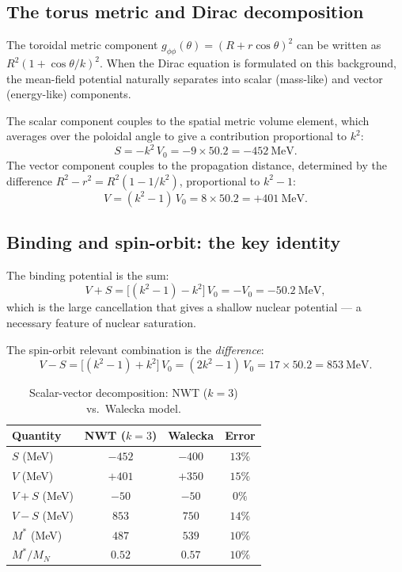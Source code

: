 \documentclass[11pt,a4paper]{article}
\begin{document}
\subsection{The torus metric and Dirac decomposition}

The toroidal metric component $g_{\phi\phi}(\theta) = (R + r\cos\theta)^2$
can be written as $R^2(1 + \cos\theta/k)^2$.  When the Dirac equation is
formulated on this background, the mean-field potential naturally separates
into scalar (mass-like) and vector (energy-like) components.

The scalar component couples to the spatial metric volume element, which
averages over the poloidal angle to give a contribution proportional to $k^2$:
\begin{equation}
  S = -k^2\, V_0 = -9 \times 50.2 = -452~\text{MeV}.
  \label{eq:scalar}
\end{equation}
The vector component couples to the propagation distance, determined by the
difference $R^2 - r^2 = R^2(1 - 1/k^2)$, proportional to $k^2 - 1$:
\begin{equation}
  V = (k^2 - 1)\, V_0 = 8 \times 50.2 = +401~\text{MeV}.
  \label{eq:vector}
\end{equation}

\subsection{Binding and spin-orbit: the key identity}

The binding potential is the sum:
\begin{equation}
  V + S = \bigl[(k^2-1) - k^2\bigr]\,V_0 = -V_0 = -50.2~\text{MeV},
  \label{eq:binding}
\end{equation}
which is the large cancellation that gives a shallow nuclear potential ---
a necessary feature of nuclear saturation.

The spin-orbit relevant combination is the \emph{difference}:
\begin{equation}
  V - S = \bigl[(k^2-1) + k^2\bigr]\,V_0 = (2k^2-1)\,V_0
  = 17 \times 50.2 = 853~\text{MeV}.
  \label{eq:vms}
\end{equation}

\begin{table}[h]
\centering
\caption{Scalar-vector decomposition: NWT ($k=3$) vs.\ Walecka model.}
\label{tab:sv}
\begin{tabular}{lccc}
\toprule
Quantity & NWT ($k=3$) & Walecka & Error \\
\midrule
$S$ (MeV)   & $-452$ & $-400$ & $13\%$ \\
$V$ (MeV)   & $+401$ & $+350$ & $15\%$ \\
$V+S$ (MeV) & $-50$  & $-50$  & $0\%$  \\
$V-S$ (MeV) & $853$  & $750$  & $14\%$ \\
$M^*$ (MeV) & $487$  & $539$  & $10\%$ \\
$M^*/M_N$   & $0.52$ & $0.57$ & $10\%$ \\
\bottomrule
\end{tabular}
\end{table}
\end{document}
